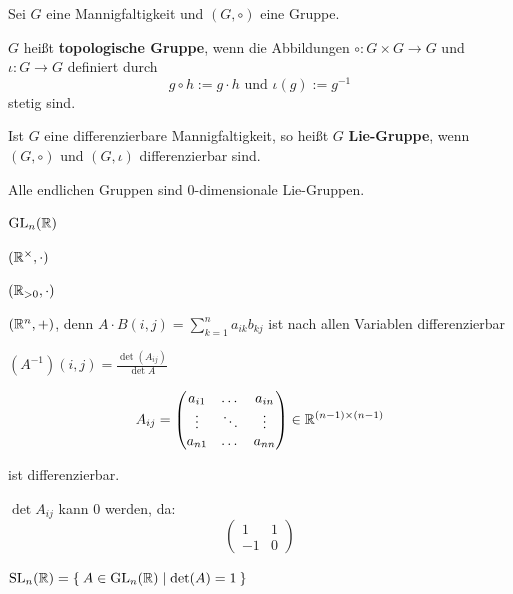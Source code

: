 \begin{definition}%
    Sei $G$ eine Mannigfaltigkeit und $(G, \circ)$ eine Gruppe.

    \begin{defenum}
        \item $G$ heißt \textbf{topologische Gruppe},
              wenn die Abbildungen $\circ: G \times G \rightarrow G$
              und $\iota: G \rightarrow G$ definiert durch
              \[g \circ h := g \cdot h \text{ und } \iota(g) := g^{-1}\]
              stetig sind.
        \item Ist $G$ eine differenzierbare Mannigfaltigkeit, so heißt
              $G$ \textbf{Lie-Gruppe}, wenn
              $(G, \circ)$ und $(G, \iota)$ differenzierbar sind.
    \end{defenum}
\end{definition}

\begin{beispiel}
    \begin{bspenum}
        \item Alle endlichen Gruppen sind 0-dimensionale Lie-Gruppen.
        \item $\mathrm{GL}_n(\mathbb{R})$ 
        \item $(\mathbb{R}^\times, \cdot)$
        \item $(\mathbb{R}_{>0}, \cdot)$
        \item $(\mathbb{R}^n, +)$, denn $A \cdot B (i,j) = \sum_{k=1}^n a_{ik} b_{kj}$ ist
              nach allen Variablen differenzierbar

              $(A^{-1}) (i,j) = \frac{\det(A_{ij})}{\det A}$

              \[A_{ij} = \begin{pmatrix}
                a_{i1} & \dots  & a_{in}\\
                \vdots & \ddots & \vdots\\
                a_{n1} & \dots  & a_{nn}
              \end{pmatrix} \in \mathbb{R}^{(n-1) \times (n-1)}\]

            ist differenzierbar.

            $\det A_{ij}$ kann $0$ werden, da:
            \[\begin{pmatrix}1 & 1\\-1&0\end{pmatrix}\]
        \item $\mathrm{SL}_n(\mathbb{R}) = \Set{A \in \ensuremath{\mathrm{GL}}_n(\ensuremath{\mathbb{R}}) | \det(A) = 1}$
    \end{bspenum}
\end{beispiel}

